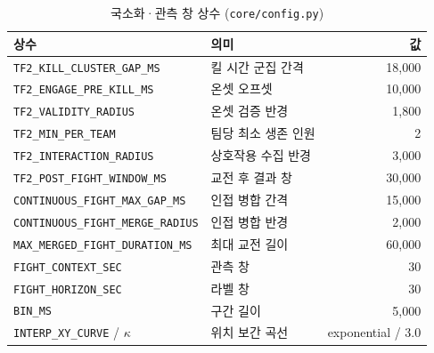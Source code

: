 \begin{table}[htbp]
  \centering
  \caption{국소화·관측 창 상수 (\texttt{core/config.py})}
  \label{tab:app-detection}
  \small
  \begin{tabular}{@{}llr@{}}
    \toprule
    상수 & 의미 & 값 \\
    \midrule
    \texttt{TF2\_KILL\_CLUSTER\_GAP\_MS} & 킬 시간 군집 간격 & 18{,}000 \\
    \texttt{TF2\_ENGAGE\_PRE\_KILL\_MS} & 온셋 오프셋 & 10{,}000 \\
    \texttt{TF2\_VALIDITY\_RADIUS} & 온셋 검증 반경 & 1{,}800 \\
    \texttt{TF2\_MIN\_PER\_TEAM} & 팀당 최소 생존 인원 & 2 \\
    \texttt{TF2\_INTERACTION\_RADIUS} & 상호작용 수집 반경 & 3{,}000 \\
    \texttt{TF2\_POST\_FIGHT\_WINDOW\_MS} & 교전 후 결과 창 & 30{,}000 \\
    \texttt{CONTINUOUS\_FIGHT\_MAX\_GAP\_MS} & 인접 병합 간격 & 15{,}000 \\
    \texttt{CONTINUOUS\_FIGHT\_MERGE\_RADIUS} & 인접 병합 반경 & 2{,}000 \\
    \texttt{MAX\_MERGED\_FIGHT\_DURATION\_MS} & 최대 교전 길이 & 60{,}000 \\
    \texttt{FIGHT\_CONTEXT\_SEC} & 관측 창 & 30 \\
    \texttt{FIGHT\_HORIZON\_SEC} & 라벨 창 & 30 \\
    \texttt{BIN\_MS} & 구간 길이 & 5{,}000 \\
    \texttt{INTERP\_XY\_CURVE} / $\kappa$ & 위치 보간 곡선 & exponential / 3.0 \\
    \bottomrule
  \end{tabular}
\end{table}
